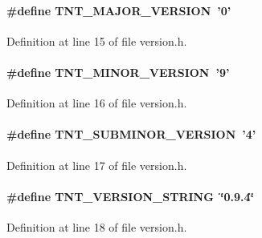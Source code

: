 \paragraph[{TNT\_\-MAJOR\_\-VERSION}]{\setlength{\rightskip}{0pt plus 5cm}\#define TNT\_\-MAJOR\_\-VERSION~'0'}\hfill\label{version_8h_a6a88a6dea9c419210729daf837322fe3}


Definition at line 15 of file version.h.

\paragraph[{TNT\_\-MINOR\_\-VERSION}]{\setlength{\rightskip}{0pt plus 5cm}\#define TNT\_\-MINOR\_\-VERSION~'9'}\hfill\label{version_8h_a49bea0c72b4fc3f5258da88311a4f1bb}


Definition at line 16 of file version.h.

\paragraph[{TNT\_\-SUBMINOR\_\-VERSION}]{\setlength{\rightskip}{0pt plus 5cm}\#define TNT\_\-SUBMINOR\_\-VERSION~'4'}\hfill\label{version_8h_ab64cd74122bb83c94bece7d71a9688b8}


Definition at line 17 of file version.h.

\paragraph[{TNT\_\-VERSION\_\-STRING}]{\setlength{\rightskip}{0pt plus 5cm}\#define TNT\_\-VERSION\_\-STRING~\char`\"{}0.9.4\char`\"{}}\hfill\label{version_8h_ae04b53d8f5fd5ba6e4da36985614c39e}


Definition at line 18 of file version.h.


